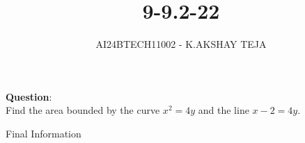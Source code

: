 \documentclass[journal]{IEEEtran}
\begin{document}

\vspace{3cm}

\title{9-9.2-22}
\author{AI24BTECH11002 - K.AKSHAY TEJA}
{\let\newpage\relax\maketitle}

\renewcommand{\thefigure}{\theenumi}
\renewcommand{\thetable}{\theenumi}
\setlength{\intextsep}{10pt} %


\renewcommand{\thetable}{\theenumi}


\textbf{Question}:\\
Find the area bounded by the curve  $x^{2} = 4y$ and the line $x - 2 = 4y$.


\solution
\begin{table}[h!]
	\centering
	
	\caption{Final Information}
	\label{tab:4-4.2-13}
\end{table}
\end{document}
